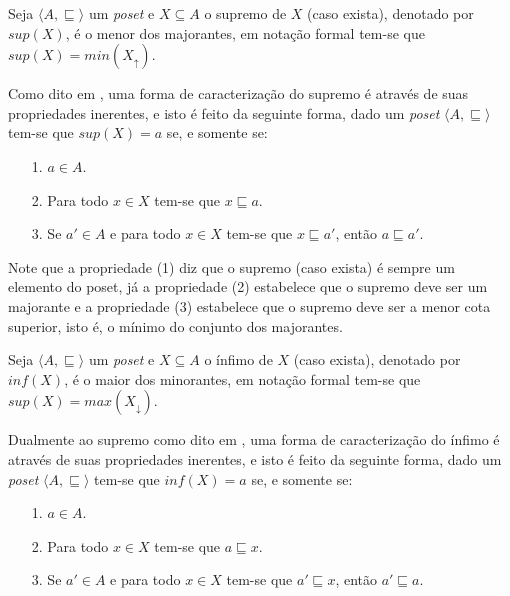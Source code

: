 \begin{definicao}[Supremo]\label{def:Supermo}
	Seja $\langle A, \sqsubseteq \rangle$ um \textit{poset} e $X \subseteq A$ o supremo de $X$ (caso exista), denotado por $sup(X)$, é o menor dos majorantes, em notação formal tem-se que $sup(X) = min(X_\uparrow)$.
\end{definicao}

Como dito em \cite{abe1991-TC, carmo2013}, uma forma de caracterização do supremo é através de suas propriedades inerentes, e isto é feito da seguinte forma, dado um \textit{poset} $\langle A, \sqsubseteq \rangle$ tem-se que $sup(X) = a $ se, e somente se:

\begin{itemize}
	\item[1.] $a \in A$.
	\item[2.] Para todo $x \in X$ tem-se que $x \sqsubseteq a$.
	\item[3.] Se $a' \in A$ e para todo $x \in X$ tem-se que  $x \sqsubseteq a'$, então $a \sqsubseteq a'$.
\end{itemize}

Note que a propriedade (1) diz que o supremo (caso exista) é sempre um elemento do poset, já a propriedade (2) estabelece que o supremo deve ser um majorante e a propriedade (3) estabelece que o supremo deve ser a menor cota superior, isto é, o mínimo do conjunto dos majorantes.

\begin{definicao}[Ínfimo]\label{def:Infimo}
	Seja $\langle A, \sqsubseteq \rangle$ um \textit{poset} e $X \subseteq A$ o ínfimo de $X$ (caso exista), denotado por $inf(X)$, é o maior dos minorantes, em notação formal tem-se que $sup(X) = max(X_\downarrow)$.
\end{definicao}

Dualmente ao supremo como dito em \cite{abe1991-TC, carmo2013}, uma forma de caracterização do ínfimo é através de suas propriedades inerentes, e isto é feito da seguinte forma, dado um \textit{poset} $\langle A, \sqsubseteq \rangle$ tem-se que $inf(X) = a $ se, e somente se:

\begin{itemize}
	\item[1.] $a \in A$.
	\item[2.] Para todo $x \in X$ tem-se que $a \sqsubseteq x$.
	\item[3.] Se $a' \in A$ e para todo $x \in X$ tem-se que  $a' \sqsubseteq x$, então $a' \sqsubseteq a$.
\end{itemize}

